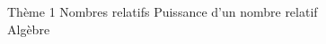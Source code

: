 \documentclass[10pt]{article}
\begin{document}
\begin{encadrementombre}{Thème 1 Nombres relatifs}
{\LARGE Puissance d'un nombre relatif }\\

{\Large Algèbre}
\end{encadrementombre}



\end{document}
